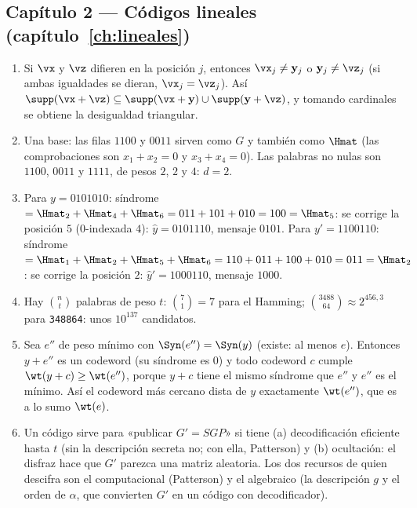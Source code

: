 \subsection*{Capítulo 2 --- Códigos lineales
(capítulo~\ref{ch:lineales})}

\begin{enumerate}[leftmargin=1.9em,itemsep=4pt]
  \item Si $\vx$ y $\vz$ difieren en la posición $j$, entonces
        $\vx_j\neq\mathbf{y}_j$ o $\mathbf{y}_j\neq\vz_j$ (si ambas igualdades se
        dieran, $\vx_j=\vz_j$). Así
        $\supp(\vx+\vz)\subseteq\supp(\vx+\mathbf{y})\cup\supp(\mathbf{y}+\vz)$,
        y tomando cardinales se obtiene la desigualdad triangular.
  \item Una base: las filas $1100$ y $0011$ sirven como $G$ y también
        como $\Hmat$ (las comprobaciones son $x_1+x_2=0$ y
        $x_3+x_4=0$). Las palabras no nulas son $1100$, $0011$ y
        $1111$, de pesos $2$, $2$ y $4$: $d=2$.
  \item Para $y=0101010$: síndrome $=\Hmat_2+\Hmat_4+\Hmat_6
        =011+101+010=100=\Hmat_5$: se corrige la posición $5$
        ($0$-indexada $4$): $\hat y=0101110$, mensaje $0101$. Para
        $y'=1100110$: síndrome $=\Hmat_1+\Hmat_2+\Hmat_5+\Hmat_6
        =110+011+100+010=011=\Hmat_2$: se corrige la posición $2$:
        $\hat y'=1000110$, mensaje $1000$.
  \item Hay $\binom{n}{t}$ palabras de peso $t$: $\binom71=7$ para
        el Hamming; $\binom{3488}{64}\approx2^{456{,}3}$ para
        \texttt{348864}: unos $10^{137}$ candidatos.
  \item Sea $e''$ de peso mínimo con $\Syn(e'')=\Syn(y)$
        (existe: al menos $e$). Entonces $y+e''$ es un codeword (su
        síndrome es $0$) y todo codeword $c$ cumple
        $\wt(y+c)\ge\wt(e'')$, porque $y+c$ tiene el mismo síndrome
        que $e''$ y $e''$ es el mínimo. Así el codeword más cercano
        dista de $y$ exactamente $\wt(e'')$, que es a lo sumo
        $\wt(e)$.
  \item Un código sirve para «publicar $G'=SGP$» si tiene (a)
        decodificación eficiente hasta $t$ (sin la descripción
        secreta no; con ella, Patterson) y (b) ocultación: el disfraz
        hace que $G'$ parezca una matriz aleatoria. Los dos recursos
        de quien descifra son el computacional (Patterson) y el
        algebraico (la descripción $g$ y el orden de $\alpha$, que
        convierten $G'$ en un código con decodificador).
\end{enumerate}

